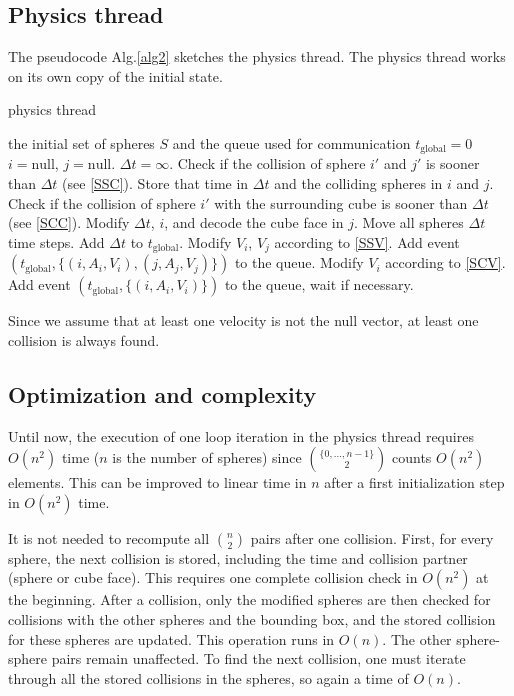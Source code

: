\documentclass[journal, letterpaper]{IEEEtran}
\begin{document}
\subsection{Physics thread}
The pseudocode Alg.\ref{alg2} sketches the physics thread. The physics thread works on its own copy of the initial state.
\begin{algorithm}
\caption{physics thread}
\label{alg2}
\begin{algorithmic}
	\REQUIRE the initial set of spheres $S$ and the queue used for communication
	\STATE $t_\text{global}=0$ 
	\LOOP
		\STATE $i=\text{null}$, $j=\text{null}$.
		\STATE $\Delta t = \infty$.
			\STATE Check if the collision of sphere $i'$ and $j'$ is sooner than $\Delta t$ (see \ref{SSC}). Store that time in $\Delta t$ and the colliding spheres in $i$ and $j$.
		\ENDFOR
		\STATE Check if the collision of sphere $i'$ with the surrounding cube is sooner than $\Delta t$ (see \ref{SCC}). Modify $\Delta t$, $i$, and decode the cube face in $j$.
		\ENDFOR
		\STATE Move all spheres $\Delta t$ time steps.
		\STATE Add $\Delta t$ to $t_\text{global}$.
			\STATE Modify $V_i$, $V_j$ according to \ref{SSV}.
			\STATE Add event $(t_\text{global}, \{(i, A_i, V_i), (j, A_j, V_j)\})$ to the queue.
			\STATE Modify $V_i$ according to \ref{SCV}.
			\STATE Add event $(t_\text{global}, \{(i, A_i, V_i)\})$ to the queue, wait if necessary.
		\ENDIF
	\ENDLOOP
\end{algorithmic}
\end{algorithm}
Since we assume that at least one velocity is not the null vector, at least one collision is always found.

\subsection{Optimization and complexity}
Until now, the execution of one loop iteration in the physics thread requires $O(n^2)$ time ($n$ is the number of spheres) since $\binom{\{0,...,n-1\}}{2}$ counts $O(n^2)$ elements. This can be improved to linear time in $n$ after a first initialization step in $O(n^2)$ time.

It is not needed to recompute all $\binom{n}{2}$ pairs after one collision. First, for every sphere, the next collision is stored, including the time and collision partner (sphere or cube face). This requires one complete collision check in $O(n^2)$ at the beginning. After a collision, only the modified spheres are then checked for collisions with the other spheres and the bounding box, and the stored collision for these spheres are updated. This operation runs in $O(n)$. The other sphere-sphere pairs remain unaffected. To find the next collision, one must iterate through all the stored collisions in the spheres, so again a time of $O(n)$.
\end{document}
